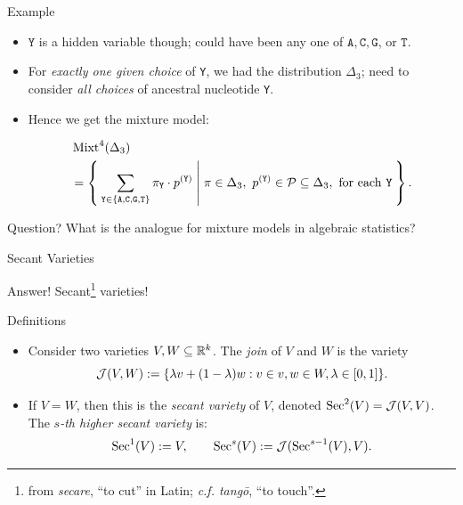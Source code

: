 \begin{frame}{Example}
    \begin{itemize}
        \item  $\texttt{Y}$ is a hidden variable though; could have been any one of $\texttt{A}, \texttt{C}, \texttt{G}$, or $\texttt{T}$.

        \item For \emph{exactly one given choice} of \texttt{Y}, we had the distribution $\Delta_{3}$; need to consider \emph{all choices} of ancestral nucleotide \texttt{Y}.

        \item Hence we get the mixture model:

        \begin{equation*}
            \begin{split}
                &\operatorname{Mixt}^{4}(\Delta_{3}) \\
                &= \Set{\sum_{ \texttt{Y} \in \{ \texttt{A}, \texttt{C}, \texttt{G}, \texttt{T} \}  } \pi_{\texttt{Y}} \cdot p^{(\texttt{Y})} | \pi \in \Delta_{3},\ p^{(\texttt{Y})} \in \mathcal{P} \subseteq \Delta_{3}, \text{ for each \texttt{Y}} }.
            \end{split}
        \end{equation*}

    \end{itemize}

    \begin{block}{Question?}
    What is the analogue for mixture models in algebraic statistics?
    \end{block}

\end{frame}

\begin{frame}{Secant Varieties}
    \begin{block}{Answer!}
        Secant\footnote{from \emph{secare}, ``to cut'' in Latin; \emph{c.f. tangō}, ``to touch''.} varieties!
    \end{block}

    \begin{block}{Definitions}
        \begin{itemize}
        \item Consider two varieties $V, W \subseteq \mathbb{R}^{k}$. The \emph{join} of $V$ and $W$ is the variety
        $$ \mathcal{J}(V,W) := \{ \lambda v + (1-\lambda)w : v \in v, w \in W, \lambda \in [0,1] \}. $$

        \item If $V = W$, then this is the \emph{secant variety} of $V$, denoted $\operatorname{Sec}^{2}(V) = \mathcal{J}(V,V)$. The \emph{$s$-th higher secant variety} is:
        $$ \operatorname{Sec}^{1}(V) := V, \qquad \operatorname{Sec}^{s}(V) := \mathcal{J}(\operatorname{Sec}^{s-1}(V), V ). $$
        \end{itemize}
    \end{block}

\end{frame}


